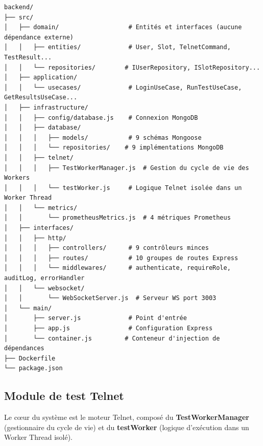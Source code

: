 \begin{lstlisting}[language={},caption={Arborescence du projet backend},label={lst:arbo_backend}]
backend/
├── src/
│   ├── domain/                   # Entités et interfaces (aucune dépendance externe)
│   │   ├── entities/             # User, Slot, TelnetCommand, TestResult...
│   │   └── repositories/        # IUserRepository, ISlotRepository...
│   ├── application/
│   │   └── usecases/             # LoginUseCase, RunTestUseCase, GetResultsUseCase...
│   ├── infrastructure/
│   │   ├── config/database.js    # Connexion MongoDB
│   │   ├── database/
│   │   │   ├── models/           # 9 schémas Mongoose
│   │   │   └── repositories/    # 9 implémentations MongoDB
│   │   ├── telnet/
│   │   │   ├── TestWorkerManager.js  # Gestion du cycle de vie des Workers
│   │   │   └── testWorker.js     # Logique Telnet isolée dans un Worker Thread
│   │   └── metrics/
│   │       └── prometheusMetrics.js  # 4 métriques Prometheus
│   ├── interfaces/
│   │   ├── http/
│   │   │   ├── controllers/      # 9 contrôleurs minces
│   │   │   ├── routes/           # 10 groupes de routes Express
│   │   │   └── middlewares/      # authenticate, requireRole, auditLog, errorHandler
│   │   └── websocket/
│   │       └── WebSocketServer.js  # Serveur WS port 3003
│   └── main/
│       ├── server.js             # Point d'entrée
│       ├── app.js                # Configuration Express
│       └── container.js         # Conteneur d'injection de dépendances
├── Dockerfile
└── package.json
\end{lstlisting}

\subsection{Module de test Telnet}

Le cœur du système est le moteur Telnet, composé du
\textbf{TestWorkerManager} (gestionnaire du cycle de vie) et du
\textbf{testWorker} (logique d'exécution dans un Worker Thread isolé).

